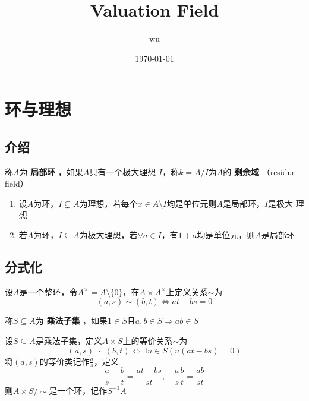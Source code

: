 \documentclass[11pt]{article}
\author{wu}
\date{\today}
\title{Valuation Field}
\begin{document}
\maketitle
\tableofcontents

\section{环与理想}
\label{sec:org87be0fc}
\subsection{介绍}
\label{sec:org40c5303}
\begin{definition}[]
称\(A\)为 \textbf{局部环} ，如果\(A\)只有一个极大理想 \(I\)，称\(k=A/I\)为\(A\)的 \textbf{剩余域} （residue field）
\end{definition}

\begin{proposition}[]
\begin{enumerate}
\item 设\(A\)为环，\(I\subsetneq A\)为理想，若每个\(x\in A\setminus I\)均是单位元则\(A\)是局部环，\(I\)是极大
理想
\item 若\(A\)为环，\(I\subseteq A\)为极大理想，若\(\forall a\in I\)，有\(1+a\)均是单位元，则\(A\)是局部环
\end{enumerate}
\end{proposition}


\subsection{分式化}
\label{sec:org26f3866}
\begin{definition}[]
设\(A\)是一个整环，令\(A^\times=A\setminus\{0\}\)，在\(A\times A^\times\)上定义关系\(\sim\)为
\begin{equation*}
(a,s)\sim(b,t)\Leftrightarrow at-bs=0
\end{equation*}
\end{definition}

\begin{definition}[]
称\(S\subseteq A\)为 \textbf{乘法子集} ，如果\(1\in S\)且\(a,b\in S\Rightarrow ab\in S\)
\end{definition}

\begin{definition}[]
设\(S\subseteq A\)是乘法子集，定义\(A\times S\)上的等价关系\(\sim\)为
\begin{equation*}
(a,s)\sim(b,t)\Leftrightarrow\exists u\in S(u(at-bs)=0)
\end{equation*}
将\((a,s)\)的等价类记作\(\frac{a}{s}\)，定义
\begin{equation*}
\frac{a}{s}+\frac{b}{t}=\frac{at+bs}{st},\quad\frac{a}{s}\frac{b}{t}=\frac{ab}{st}
\end{equation*}
则\(A\times S/\sim\)是一个环，记作\(S^{-1}A\)
\end{definition}
\end{document}
